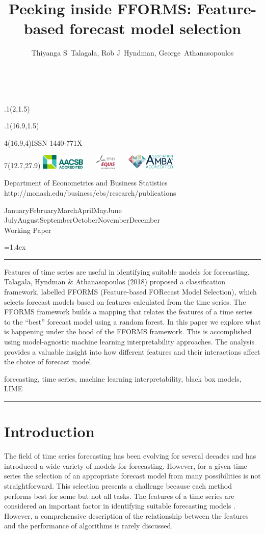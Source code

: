 \documentclass[11pt,a4paper,]{article}
\title{Peeking inside FFORMS: Feature-based forecast model selection}
\author{Thiyanga S~Talagala, Rob J~Hyndman, George~Athanasopoulos}
\date{\sf\Date~\Month~\Year}
\makeatletter
\def\Date{\number\day}
\def\Month{\ifcase\month\or
 January\or February\or March\or April\or May\or June\or
 July\or August\or September\or October\or November\or December\fi}
\def\Year{\number\year}
\def\showjel{{\large\textsf{\textbf{JEL classification:}}~\@jel}}
\def\cover{{\sffamily\setcounter{page}{0}
        \thispagestyle{empty}
        \placefig{2}{1.5}{width=5cm}{monash2}
        \placefig{16.9}{1.5}{width=2.1cm}{MBusSchool}
        \begin{textblock}{4}(16.9,4)ISSN 1440-771X\end{textblock}
        \begin{textblock}{7}(12.7,27.9)\hfill
        \includegraphics[height=0.7cm]{AACSB}~~~
        \includegraphics[height=0.7cm]{EQUIS}~~~
        \includegraphics[height=0.7cm]{AMBA}
        \end{textblock}
        \vspace*{2cm}
        \begin{center}\Large
        Department of Econometrics and Business Statistics\\[.5cm]
        \footnotesize http://monash.edu/business/ebs/research/publications
        \end{center}\vspace{2cm}
        \begin{center}
        \fbox{\parbox{14cm}{\begin{onehalfspace}\centering\Huge\vspace*{0.3cm}
                \textsf{\textbf{\expandafter{\@title}}}\vspace{1cm}\par
                \LARGE\@author\end{onehalfspace}
        }}
        \end{center}
        \vfill
                \begin{center}\Large
                \Month~\Year\\[1cm]
                Working Paper \@wp
        \end{center}\vspace*{2cm}}}
\def\pageone{{\sffamily\setstretch{1}%
        \thispagestyle{empty}%
        \vbox to \textheight{%
        \raggedright\baselineskip=1.2cm
     {\fontsize{24.88}{30}\sffamily\textbf{\expandafter{\@title}}}
        \vspace{2cm}\par
        \hspace{1cm}\parbox{14cm}{\sffamily\large\@addresses}\vspace{1cm}\vfill
        \hspace{1cm}{\large\Date~\Month~\Year}\\[1cm]
        \hspace{1cm}\showjel\vss}}}
\def\blindtitle{{\sffamily
     \thispagestyle{plain}\raggedright\baselineskip=1.2cm
     {\fontsize{24.88}{30}\sffamily\textbf{\expandafter{\@title}}}\vspace{1cm}\par
        }}
\def\titlepage{{\cover\newpage\pageone\newpage\blindtitle}}
\let\maketitle\titlepage
\newenvironment{keywords}{\par\vspace{0.5cm}\noindent{\sffamily\textbf{Keywords:}}}{\vspace{0.25cm}\par\hrule\vspace{0.5cm}\par}
\renewenvironment{abstract}{\begin{minipage}{\textwidth}\parskip=1.4ex\noindent
\hrule\vspace{0.1cm}\par{\sffamily\textbf{\abstractname}}\newline}
  {\end{minipage}}
\def\placefig#1#2#3#4{\begin{textblock}{.1}(#1,#2)\rlap{\texttt{[image: \#4]}}\end{textblock}}
\makeatother
\begin{document}
\maketitle
\begin{abstract}
Features of time series are useful in identifying suitable models for forecasting. Talagala, Hyndman \& Athanasopoulos (2018) proposed a classification framework, labelled FFORMS (Feature-based FORecast Model Selection), which selects forecast models based on features calculated from the time series. The FFORMS framework builds a mapping that relates the features of a time series to the ``best'' forecast model using a random forest. In this paper we explore what is happening under the hood of the FFORMS framework. This is accomplished using model-agnostic machine learning interpretability approaches. The analysis provides a valuable insight into how different features and their interactions affect the choice of forecast model.
\end{abstract}
\begin{keywords}
forecasting, time series, machine learning interpretability, black box models, LIME
\end{keywords}

\hypertarget{intro}{%
\section{Introduction}\label{intro}}

The field of time series forecasting has been evolving for several decades and has introduced a wide variety of models for forecasting. However, for a given time series the selection of an appropriate forecast model from many possibilities is not straightforward. This selection presents a challenge because each method performs best for some but not all tasks. The features of a time series are considered an important factor in identifying suitable forecasting models \autocites{collopy1992rule}{meade2000evidence}{makridakis2000m3}{wang2009rule}. However, a comprehensive description of the relationship between the features and the performance of algorithms is rarely discussed.
\end{document}

